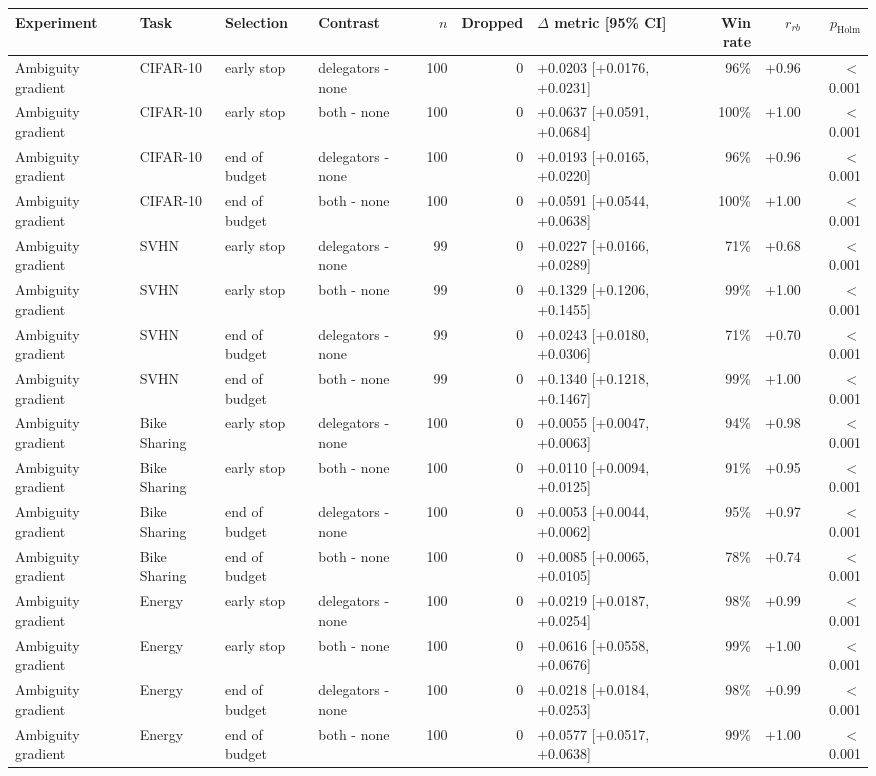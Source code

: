 \begin{tabular}{llllrrlrrr}
\toprule
Experiment & Task & Selection & Contrast & $n$ & Dropped & $\Delta$ metric [95\% CI] & Win rate & $r_{rb}$ & $p_{\mathrm{Holm}}$ \\
\midrule
Ambiguity gradient & CIFAR-10 & early stop & delegators - none & 100 & 0 & +0.0203 [+0.0176, +0.0231] & 96\% & +0.96 & $<$0.001 \\
Ambiguity gradient & CIFAR-10 & early stop & both - none & 100 & 0 & +0.0637 [+0.0591, +0.0684] & 100\% & +1.00 & $<$0.001 \\
Ambiguity gradient & CIFAR-10 & end of budget & delegators - none & 100 & 0 & +0.0193 [+0.0165, +0.0220] & 96\% & +0.96 & $<$0.001 \\
Ambiguity gradient & CIFAR-10 & end of budget & both - none & 100 & 0 & +0.0591 [+0.0544, +0.0638] & 100\% & +1.00 & $<$0.001 \\
Ambiguity gradient & SVHN & early stop & delegators - none & 99 & 0 & +0.0227 [+0.0166, +0.0289] & 71\% & +0.68 & $<$0.001 \\
Ambiguity gradient & SVHN & early stop & both - none & 99 & 0 & +0.1329 [+0.1206, +0.1455] & 99\% & +1.00 & $<$0.001 \\
Ambiguity gradient & SVHN & end of budget & delegators - none & 99 & 0 & +0.0243 [+0.0180, +0.0306] & 71\% & +0.70 & $<$0.001 \\
Ambiguity gradient & SVHN & end of budget & both - none & 99 & 0 & +0.1340 [+0.1218, +0.1467] & 99\% & +1.00 & $<$0.001 \\
Ambiguity gradient & Bike Sharing & early stop & delegators - none & 100 & 0 & +0.0055 [+0.0047, +0.0063] & 94\% & +0.98 & $<$0.001 \\
Ambiguity gradient & Bike Sharing & early stop & both - none & 100 & 0 & +0.0110 [+0.0094, +0.0125] & 91\% & +0.95 & $<$0.001 \\
Ambiguity gradient & Bike Sharing & end of budget & delegators - none & 100 & 0 & +0.0053 [+0.0044, +0.0062] & 95\% & +0.97 & $<$0.001 \\
Ambiguity gradient & Bike Sharing & end of budget & both - none & 100 & 0 & +0.0085 [+0.0065, +0.0105] & 78\% & +0.74 & $<$0.001 \\
Ambiguity gradient & Energy & early stop & delegators - none & 100 & 0 & +0.0219 [+0.0187, +0.0254] & 98\% & +0.99 & $<$0.001 \\
Ambiguity gradient & Energy & early stop & both - none & 100 & 0 & +0.0616 [+0.0558, +0.0676] & 99\% & +1.00 & $<$0.001 \\
Ambiguity gradient & Energy & end of budget & delegators - none & 100 & 0 & +0.0218 [+0.0184, +0.0253] & 98\% & +0.99 & $<$0.001 \\
Ambiguity gradient & Energy & end of budget & both - none & 100 & 0 & +0.0577 [+0.0517, +0.0638] & 99\% & +1.00 & $<$0.001 \\
\bottomrule
\end{tabular}
